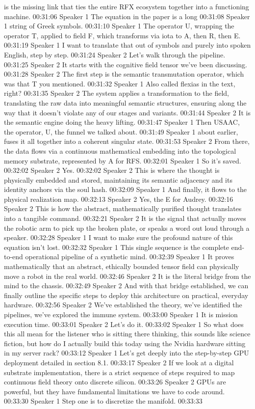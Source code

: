 is the missing link that ties the entire RFX ecosystem together into a functioning machine. 00:31:06 Speaker 1 The equation in the paper is a long 00:31:08 Speaker 1 string of Greek symbols. 00:31:10 Speaker 1 The operator U, wrapping the operator T, applied to field F, which transforms via iota to A, then R, then E. 00:31:19 Speaker 1 I want to translate that out of symbols and purely into spoken English, step by step. 00:31:24 Speaker 2 Let's walk through the pipeline. 00:31:25 Speaker 2 It starts with the cognitive field tensor we've been discussing. 00:31:28 Speaker 2 The first step is the semantic transmutation operator, which was that T you mentioned. 00:31:32 Speaker 1 Also called flexias in the text, right? 00:31:35 Speaker 2 The system applies a transformation to the field, translating the raw data into meaningful semantic structures, ensuring along the way that it doesn't violate any of our stages and variants. 00:31:44 Speaker 2 It is the semantic engine doing the heavy lifting. 00:31:47 Speaker 1 Then USAAC, the operator, U, the funnel we talked about. 00:31:49 Speaker 1 about earlier, fuses it all together into a coherent singular state. 00:31:53 Speaker 2 From there, the data flows via a continuous mathematical embedding into the topological memory substrate, represented by A for RFS. 00:32:01 Speaker 1 So it's saved. 00:32:02 Speaker 2 Yes. 00:32:02 Speaker 2 This is where the thought is physically embedded and stored, maintaining its semantic adjacency and its identity anchors via the soul hash. 00:32:09 Speaker 1 And finally, it flows to the physical realization map. 00:32:13 Speaker 2 Yes, the E for Audrey. 00:32:16 Speaker 2 This is how the abstract, mathematically purified thought translates into a tangible command. 00:32:21 Speaker 2 It is the signal that actually moves the robotic arm to pick up the broken plate, or speaks a word out loud through a speaker. 00:32:28 Speaker 1 I want to make sure the profound nature of this equation isn't lost. 00:32:32 Speaker 1 This single sequence is the complete end-to-end operational pipeline of a synthetic mind. 00:32:39 Speaker 1 It proves mathematically that an abstract, ethically bounded tensor field can physically move a robot in the real world. 00:32:46 Speaker 2 It is the literal bridge from the mind to the chassis. 00:32:49 Speaker 2 And with that bridge established, we can finally outline the specific steps to deploy this architecture on practical, everyday hardware. 00:32:56 Speaker 2 We've established the theory, we've identified the pipelines, we've explored the immune system. 00:33:00 Speaker 1 It is mission execution time. 00:33:01 Speaker 2 Let's do it. 00:33:02 Speaker 1 So what does this all mean for the listener who is sitting there thinking, this sounds like science fiction, but how do I actually build this today using the Nvidia hardware sitting in my server rack? 00:33:12 Speaker 1 Let's get deeply into the step-by-step GPU deployment detailed in section 8.1. 00:33:17 Speaker 2 If we look at a digital substrate implementation, there is a strict sequence of steps required to map continuous field theory onto discrete silicon. 00:33:26 Speaker 2 GPUs are powerful, but they have fundamental limitations we have to code around. 00:33:30 Speaker 1 Step one is to discretize the manifold. 00:33:33 